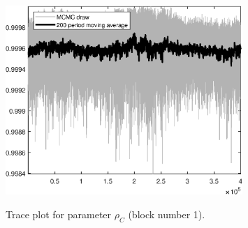 \begin{figure}[H]
\centering
  \includegraphics[width=0.8\textwidth]{BRS_growth/graphs/TracePlot_rho_C_blck_1}\\
    \caption{Trace plot for parameter ${\rho_C}$ (block number 1).}
\end{figure}
